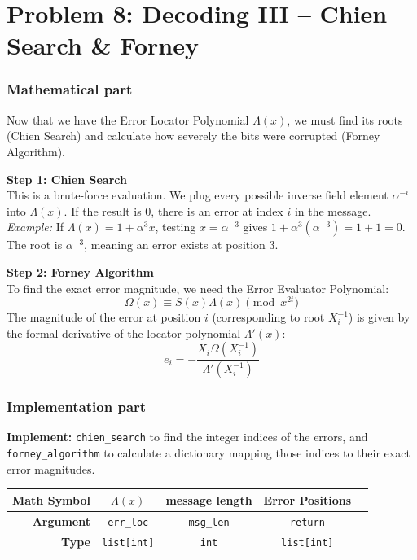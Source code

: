 \documentclass[11pt]{article}
\begin{document}
\section*{Problem 8: Decoding III -- Chien Search \& Forney}

\subsubsection*{Mathematical part}
Now that we have the Error Locator Polynomial $\Lambda(x)$, we must find its roots (Chien Search) and calculate how severely the bits were corrupted (Forney Algorithm).

\textbf{Step 1: Chien Search} \\
This is a brute-force evaluation. We plug every possible inverse field element $\alpha^{-i}$ into $\Lambda(x)$. If the result is $0$, there is an error at index $i$ in the message.
\textit{Example:} If $\Lambda(x) = 1 + \alpha^3 x$, testing $x = \alpha^{-3}$ gives $1 + \alpha^3(\alpha^{-3}) = 1 + 1 = 0$. The root is $\alpha^{-3}$, meaning an error exists at position $3$.

\textbf{Step 2: Forney Algorithm} \\
To find the exact error magnitude, we need the Error Evaluator Polynomial:
$$\Omega(x) \equiv S(x)\Lambda(x) \pmod{x^{2t}}$$
The magnitude of the error at position $i$ (corresponding to root $X_i^{-1}$) is given by the formal derivative of the locator polynomial $\Lambda'(x)$:
$$e_i = - \frac{X_i \Omega(X_i^{-1})}{\Lambda'(X_i^{-1})}$$

\subsubsection*{Implementation part}
\textbf{Implement:} \lstinline|chien_search| to find the integer indices of the errors, and \lstinline|forney_algorithm| to calculate a dictionary mapping those indices to their exact error magnitudes.

\begin{center}
\renewcommand{\arraystretch}{2.0}
\begin{tabular}{r | c | c | c | c}
\toprule
\textbf{Math Symbol} & $\Lambda(x)$ & message length & Error Positions \\ \midrule
\textbf{Argument} & \lstinline|err_loc| & \lstinline|msg_len| & \lstinline|return| \\ \midrule
\textbf{Type} & \lstinline|list[int]| & \lstinline|int| & \lstinline|list[int]| \\
\bottomrule
\end{tabular}
\end{center}
\end{document}
